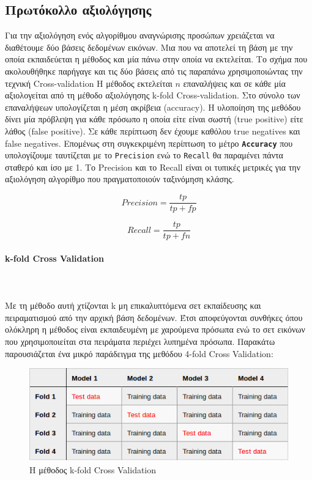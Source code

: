\subsection{Πρωτόκολλο αξιολόγησης}
Για την αξιολόγηση ενός αλγορίθμου αναγνώρισης προσώπων χρειάζεται να διαθέτουμε δύο
βάσεις δεδομένων εικόνων. Μια που να αποτελεί τη βάση με την οποία εκπαιδεύεται η
μέθοδος και μία πάνω στην οποία να εκτελείται. Το σχήμα που ακολουθήθηκε παρήγαγε
και τις δύο βάσεις από τις παραπάνω χρησιμοποιώντας την τεχνική Cross-validation
Η μέθοδος εκτελείται $n$ επαναλήψεις  και σε κάθε μία αξιολογείται από τη μέθοδο
αξιολόγησης k-fold Cross-validation. Στο σύνολο των επαναλήψεων υπολογίζεται
η μέση ακρίβεια (accuracy). Η υλοποίηση της μεθόδου δίνει μία πρόβλεψη για κάθε
πρόσωπο η οποία είτε είναι σωστή (true positive) είτε λάθος (false positive).
Σε κάθε περίπτωση δεν έχουμε καθόλου true negatives και false negatives. Επομένως
στη συγκεκριμένη περίπτωση το μέτρο \textbf{\texttt{Accuracy}} που υπολογίζουμε ταυτίζεται με το \texttt{Precision}
ενώ το \texttt{Recall} θα παραμένει πάντα σταθερό και ίσο με 1. Το Precision και
το Recall είναι οι τυπικές μετρικές για την αξιολόγηση αλγορίθμο που πραγματοποιούν
ταξινόμηση κλάσης.

$$
Precision = \frac{tp}{tp + fp}
$$

$$
Recall = \frac{tp}{tp + fn}
$$


\paragraph{k-fold Cross Validation} \hspace*{3pt}\\
\\
Με τη μέθοδο αυτή χτίζονται k μη επικαλυπτόμενα σετ εκπαίδευσης και πειραματισμού
από την αρχική βάση δεδομένων. Έτσι αποφεύγονται συνθήκες όπου ολόκληρη η μέθοδος
είναι εκπαιδευμένη με χαρούμενα πρόσωπα ενώ το σετ εικόνων που χρησιμοποιείται στα
πειράματα περιέχει λυπημένα πρόσωπα. Παρακάτω παρουσιάζεται ένα μικρό παράδειγμα της
μεθόδου 4-fold Cross Validation:

\newpage


\begin{figure}[htbp]
  \begin{center}
    \includegraphics[width=0.8\maxwidth]{../figures/kfold.png}
    \caption{Η μέθοδος k-fold Cross Validation \label{fig:rcnn}}
   \end{center}
\end{figure}

